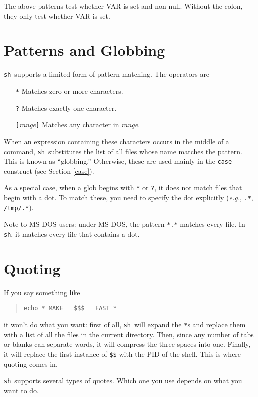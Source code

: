 \documentclass{article}
\newcommand{\code}[1]{\texttt{#1}}
\newcommand{\sh}{\code{sh}}
\begin{document}
	The above patterns test whether VAR is set and
non-null. Without the colon, they only test whether VAR is set.

\section{Patterns and Globbing}

	\label{glob}
	\sh\ supports a limited form of
pattern-matching. The operators are

\begin{itemize}
\item[\code{*}]
	Matches zero or more characters.
\item[\code{?}]
	Matches exactly one character.
\item[\code{[}\textit{range}\code{]}]
	Matches any character in \textit{range}.
\end{itemize}

	When an expression containing these characters occurs in the
middle of a command, \sh\ substitutes the list of all files whose name
matches the pattern. This is known as ``globbing.'' Otherwise, these
are used mainly in the \code{case} construct (see Section \ref{case}).

	As a special case, when a glob begins with \code{*} or
\code{?}, it does not match files that begin with a dot. To match
these, you need to specify the dot explicitly (\textit{e.g.},
\code{.*}, \code{/tmp/.*}).

	Note to MS-DOS users: under MS-DOS, the pattern \code{*.*}
matches every file. In \sh, it matches every file that contains a dot.

\section{Quoting}

	\label{quoting}If you say something like
\begin{quote}
\code{echo * MAKE\ \ \ \$\$\$\ \ \ FAST *}
\end{quote}
it won't do what you want: first of all, \sh\ will expand the
\code{*}s and replace them with a list of all the files in the current
directory. Then, since any number of tabs or blanks can separate
words, it will compress the three spaces into one. Finally, it will
replace the first instance of \code{\$\$} with the PID of the
shell. This is where quoting comes in.

	\sh\ supports several types of quotes. Which one you use
depends on what you want to do.
\end{document}
